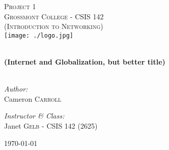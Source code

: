 \begin{titlepage}
\begin{center}

\textsc{\Large Project 1 }\\[1.5cm]
\textsc{\Large Grossmont College - CSIS 142}\\
\textsc{(Introduction to Networking)}\\[0.5cm]
\texttt{[image: ./logo.jpg]}

\HRule \\[0.4cm]
{ \LARGE \bfseries (Internet and Globalization, but better title)}\\[0.5cm]

\HRule \\[1.5cm]

\begin{minipage}{0.4\textwidth}
\begin{flushleft} \large
\emph{Author:}\\
Cameron \textsc{Carroll}
\end{flushleft}
\end{minipage}
\begin{minipage}{0.4\textwidth}
\begin{flushright} \large
\emph{Instructor \& Class:}\\
Janet \textsc{Gelb} - CSIS 142 (2625)
\end{flushright}
\end{minipage}

\vfill

{\large \today}

\end{center}
\end{titlepage}